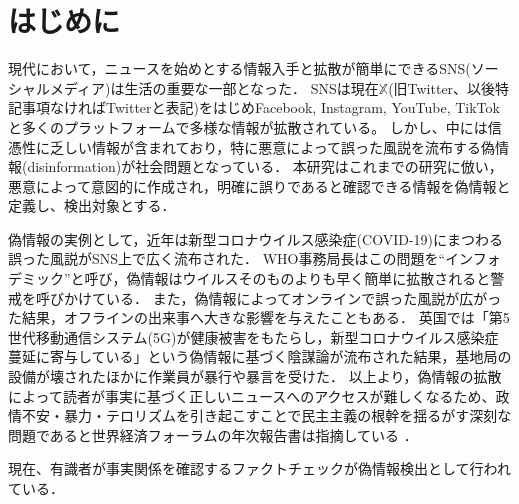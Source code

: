 \chapter{はじめに}
\label{ch:introduction}
現代において，ニュースを始めとする情報入手と拡散が簡単にできるSNS(ソーシャルメディア)は生活の重要な一部となった．
SNSは現在$\mathbb{X}$(旧Twitter、以後特記事項なければTwitterと表記)をはじめFacebook, Instagram, YouTube, TikTokと多くのプラットフォームで多様な情報が拡散されている。
しかし、中には信憑性に乏しい情報が含まれており，特に悪意によって誤った風説を流布する偽情報(disinformation)が社会問題となっている．
本研究はこれまでの研究\cite{Shu:2017:FND:3137597.3137600,Ruchansky:2017:CHD:3132847.3132877,Wang:2018:EEA:3219819.3219903}に倣い，悪意によって意図的に作成され，明確に誤りであると確認できる情報を偽情報と定義し、検出対象とする．

偽情報の実例として，近年は新型コロナウイルス感染症(COVID-19)にまつわる誤った風説がSNS上で広く流布された．
WHO事務局長はこの問題を``インフォデミック''と呼び，偽情報はウイルスそのものよりも早く簡単に拡散されると警戒を呼びかけている\cite{ZAROCOSTAS2020676}．
また，偽情報によってオンラインで誤った風説が広がった結果，オフラインの出来事へ大きな影響を与えたこともある．
英国では「第5世代移動通信システム(5G)が健康被害をもたらし，新型コロナウイルス感染症蔓延に寄与している」という偽情報に基づく陰謀論が流布された結果，基地局の設備が壊された\cite{waterson_hern_2020}ほかに作業員が暴行や暴言を受けた\cite{hern_2020}．
以上より，偽情報の拡散によって読者が事実に基づく正しいニュースへのアクセスが難しくなるため、政情不安・暴力・テロリズムを引き起こすことで民主主義の根幹を揺るがす深刻な問題であると世界経済フォーラムの年次報告書は指摘している \cite{mclennan2024global}．

現在、有識者が事実関係を確認するファクトチェックが偽情報検出として行われている．

